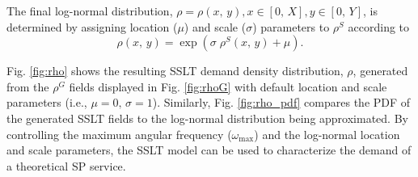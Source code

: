 \documentclass[12pt,dvipsnames]{report}
\begin{document}
The final log-normal distribution, $\rho = \rho\left(x,\, y\right), x \in [0,\, X], y \in [0,\, Y]$, is determined by assigning location ($\mu$) and scale ($\sigma$) parameters to $\rho^S$ according to
\begin{equation}\label{eq:rhoLN}
\rho\left(x,\, y\right) = \exp\left(\sigma \; \rho^S\left(x,\, y\right)+\mu\right).
\end{equation}

Fig. \ref{fig:rho} shows the resulting SSLT demand density distribution, $\rho$, generated from the $\rho^G$ fields displayed in Fig. \ref{fig:rhoG} with default location and scale parameters (i.e., $\mu = 0,\, \sigma = 1$).  Similarly, Fig. \ref{fig:rho_pdf} compares the PDF of the generated SSLT fields to the log-normal distribution being approximated.  By controlling the maximum angular frequency ($\omega_{\max}$) and the log-normal location and scale parameters, the SSLT model can be used to characterize the demand of a theoretical SP service.
\end{document}
